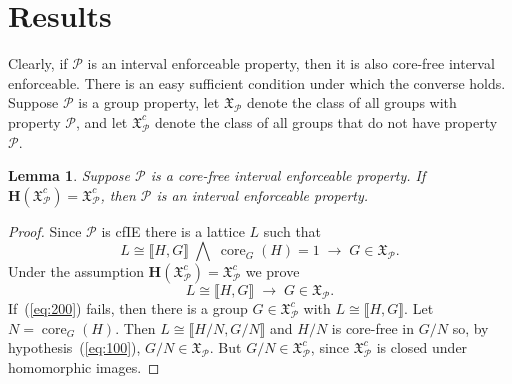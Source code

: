 \documentclass{gen-j-l}
\newcommand{\lb}{\ensuremath{\llbracket}}
\newcommand{\rb}{\ensuremath{\rrbracket}}
\newcommand{\<}{\ensuremath{\langle}}
\renewcommand{\>}{\ensuremath{\rangle}}
\theoremstyle{plain}
\newtheorem{lemma}[theorem]{Lemma}
\theoremstyle{definition}
\theoremstyle{remark}
\numberwithin{theorem}{section}
\numberwithin{claim}{section}
\numberwithin{equation}{section}
\numberwithin{conjecture}{section}
\newcommand{\Meet}{\ensuremath{\bigwedge}}
\newcommand{\core}{\ensuremath{\operatorname{core}}}
\newcommand{\2}{\ensuremath{\mathbf{2}}}
\newcommand{\3}{\ensuremath{\mathbf{3}}}
\newcommand{\sG}{\ensuremath{\mathfrak{X}}}
\newcommand{\bH}{\ensuremath{\mathbf{H}}}
\newcommand{\cP}{\ensuremath{\mathcal{P}}}
\begin{document}
\section{Results}
Clearly, if $\cP$ is an interval enforceable property, then it is also
core-free interval enforceable.  There is an easy
sufficient condition under which the converse holds.  
Suppose $\cP$ is a group property, let $\sG_{\cP}$  denote the
class of all groups with property $\cP$, and let
 $\sG_{\cP}^c$ denote the class of all groups that do not have property $\cP$.
\begin{lemma}
\label{lemma-wjd-2}
Suppose $\cP$ is a core-free interval enforceable property.  
If $\bH(\sG_{\cP}^c) = \sG_{\cP}^c$, then $\cP$ is an interval enforceable property.
\end{lemma}
\begin{proof}
Since $\cP$ is \acs{cfIE} there is a lattice $L$ such that
\begin{equation}
  \label{eq:100}
L \cong \lb H,G \rb \; \Meet \; \core_G(H)=1 \; \longrightarrow \; G\in \sG_\cP.
\end{equation}
Under the assumption $\bH(\sG_\cP^c) = \sG_\cP^c$ we prove
\begin{equation}
  \label{eq:200}
L \cong \lb H,G \rb \; \longrightarrow \; G\in \sG_\cP.
\end{equation}
If~(\ref{eq:200}) fails, then there is a
group $G\in \sG_{\cP}^c$ with $L\cong \lb H,G \rb$.  Let $N = \core_G(H)$.  Then $L \cong
\lb H/N,G/N \rb$ and $H/N$ is core-free in $G/N$ so, by hypothesis~(\ref{eq:100}),
$G/N \in \sG_\cP$.  But $G/N \in \sG_{\cP}^c$, since $\sG_{\cP}^c$ is closed under homomorphic images.
\end{proof}
\end{document}
